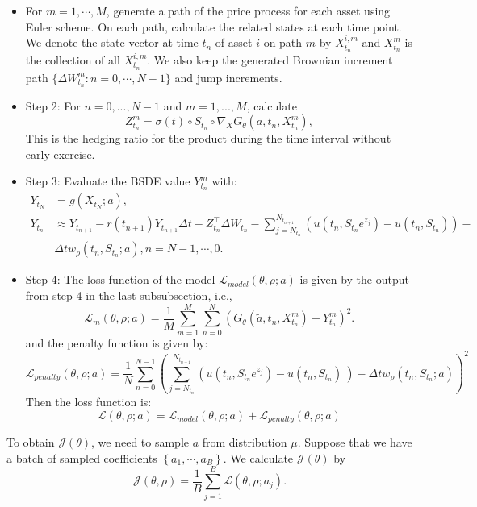 \documentclass[11pt,a4paper]{article}
\theoremstyle{remark}
\begin{document}
	\begin{itemize}
		\item  For $m=1,\cdots, M$, generate a path of the price process for each asset using Euler scheme. On each path, calculate the related states at each time point. We denote the state vector at time $t_n$ of asset $i$ on path $m$ by $X_{t_n}^{i,m}$ and $X_{t_n}^{m}$ is the collection of all $X_{t_n}^{i,m}$. We also keep the generated Brownian increment path $\{\Delta W_{t_n}^m: n=0,\cdots, N-1\}$ and jump increments.
		
		\item Step 2: For $n=0,...,N-1$ and $m=1,...,M$, calculate 
		\begin{equation}\label{eq:Z}
			Z_{t_n}^m = \sigma(t)\circ S_{t_{n}}\circ\nabla_X G_{\theta}(a, t_{n}, X_{t_n}^{m}),	
		\end{equation}
		This is the hedging ratio for the product during the time interval without early exercise.
		
		\item Step 3: Evaluate the BSDE value $Y_{t_n}^m$ with:
		\begin{align}
			Y_{t_N} & = g(X_{t_N}; a),  \\
			Y_{t_n} &\approx Y_{t_{n+1}} - r(t_{n+1}) Y_{t_{n+1}}\Delta t  -  Z_{t_n}^\top \Delta W_{t_n}-
			\sum_{j=N_{t_n}}^{N_{t_{n+1}}}\left(u(t_n, S_{t_n}e^{z_j}) - u(t_n, S_{t_n})\right) - \\
			&\Delta t w_{\rho}\left(t_n, S_{t_n}; a\right) , n=N-1,\cdots,0. 
		\end{align}
		
		\item Step 4:  The loss function of the model $\mathcal{L}_{model}(\theta, \rho; a)$ is given by the output from step 4 in the last subsubsection, i.e., 
		\begin{equation}\label{eq:loss-jump-a}
			\mathcal{L}_{m}(\theta, \rho; a)=\frac{1}{M}\sum_{m=1}^M\sum_{n=0}^N\left(G_{\theta}(\tilde{a}, t_{n}, X_{t_n}^m) - Y_{t_n}^m \right)^2.
		\end{equation}
		and the penalty function is given by:
		\begin{equation}\label{eq:penalty-jump-a}
			\mathcal{L}_{penalty}(\theta, \rho; a) =\frac{1}{N}\sum_{n=0}^{N-1} \left(\sum_{j=N_{t_n}}^{N_{t_{n+1}}}\left( u(t_n, S_{t_n}e^{z_j}) - u(t_n, S_{t_n})\ \right)-\Delta t w_{\rho}\left(t_n, S_{t_n}; a\right)\right)^2
		\end{equation}
		Then the loss function is:
		\begin{equation}
			\mathcal{L}(\theta, \rho; a)  = \mathcal{L}_{model}(\theta, \rho; a) + \mathcal{L}_{penalty}(\theta, \rho; a) 
		\end{equation}
	\end{itemize}
	To obtain $\mathcal{J}(\theta)$, we need to sample $a$ from distribution $\mu$. Suppose that we have a batch of sampled coefficients $\left\{a_1,\cdots,a_B\right\}$. We calculate $\mathcal{J}\left(\theta\right)$ by 
	\begin{equation}\label{eq:total-loss}
		\mathcal{J}\left(\theta,\rho\right) = \frac{1}{B}\sum_{j=1}^B \mathcal{L}(\theta, \rho; a_j).
	\end{equation}
	
\end{document}
